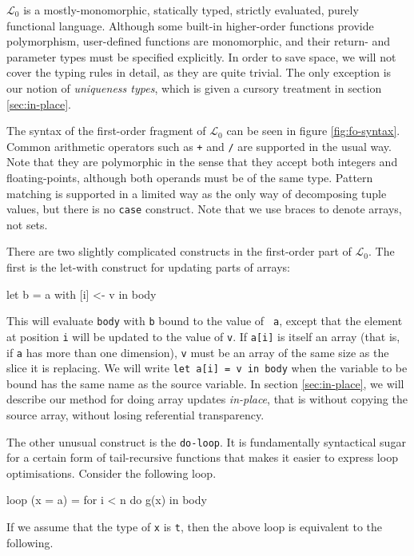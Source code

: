 \documentclass{sigplanconf}  %
\newcommand{\LO}{$\mathcal{L}_0$}
\begin{document}
\LO{} is a mostly-monomorphic, statically typed, strictly evaluated,
purely functional language.  Although some built-in higher-order
functions provide polymorphism, user-defined functions are
monomorphic, and their return- and parameter types must be specified
explicitly.  In order to save space, we will not cover the typing
rules in detail, as they are quite trivial.  The only exception is our
notion of {\em uniqueness types}, which is given a cursory treatment
in section \ref{sec:in-place}.

The syntax of the first-order fragment of \LO{} can be seen in figure
\ref{fig:fo-syntax}.  Common arithmetic operators such as {\tt +} and
{\tt /} are supported in the usual way.  Note that they are
polymorphic in the sense that they accept both integers and
floating-points, although both operands must be of the same type.
Pattern matching is supported in a limited way as the only way of
decomposing tuple values, but there is no {\tt case} construct.  Note
that we use braces to denote arrays, not sets.

There are two slightly complicated constructs in the first-order part
of \LO{}.  The first is the let-with construct for updating parts of
arrays:

\begin{colorcode}
let b = a with [i] <- v in body
\end{colorcode}

This will evaluate {\tt body} with {\tt b} bound to the value of {\tt
  a}, except that the element at position {\tt i} will be updated to
the value of {\tt v}.  If {\tt a[i]} is itself an array (that is, if
{\tt a} has more than one dimension), {\tt v} must be an array of the
same size as the slice it is replacing.  We will write {\tt let a[i] =
  v in body} when the variable to be bound has the same name as the
source variable.  In section \ref{sec:in-place}, we will describe our
method for doing array updates {\em in-place}, that is without copying
the source array, without losing referential transparency.

The other unusual construct is the {\tt do-loop}.  It is fundamentally
syntactical sugar for a certain form of tail-recursive functions that
makes it easier to express loop optimisations.  Consider the following
loop.

\begin{colorcode}
loop (x = a) = for i < n do
                 g(x)
in body
\end{colorcode}

If we assume that the type of {\tt x} is {\tt t}, then the above loop
is equivalent to the following.
\end{document}
